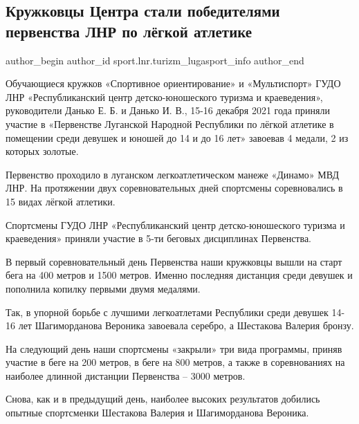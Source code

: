  
 
 
 
 
\subsection{Кружковцы Центра стали победителями первенства ЛНР по лёгкой атлетике}
\label{sec:16_12_2021.stz.sport.lnr.turizm_lugasport_info.1.pervenstvo_lnr_legkaja_atletika}

\ifcmt
 author_begin
   author_id sport.lnr.turizm_lugasport_info
 author_end
\fi

Обучающиеся кружков «Спортивное ориентирование» и «Мультиспорт» ГУДО ЛНР
«Республиканский центр детско-юношеского туризма и краеведения», руководители
Данько Е. Б. и Данько И. В., 15-16 декабря 2021 года приняли участие в
«Первенстве Луганской Народной Республики по лёгкой атлетике в помещении среди
девушек и юношей до 14 и до 16 лет» завоевав 4 медали, 2 из которых золотые.

Первенство проходило в луганском легкоатлетическом манеже «Динамо» МВД ЛНР. На
протяжении двух соревновательных дней спортсмены соревновались  в 15 видах
лёгкой атлетики.

Спортсмены ГУДО ЛНР «Республиканский центр детско-юношеского туризма и
краеведения» приняли участие в 5-ти беговых дисциплинах Первенства.

В первый соревновательный день Первенства наши кружковцы вышли на старт бега на
400 метров и 1500 метров. Именно последняя дистанция среди девушек и пополнила
копилку первыми двумя медалями.

Так, в упорной борьбе с лучшими легкоатлетами Республики среди девушек 14-16
лет Шагиморданова Вероника завоевала серебро, а Шестакова Валерия бронзу.


На следующий день наши спортсмены «закрыли» три вида программы, приняв участие
в беге на 200 метров, в беге на 800 метров, а также в соревнованиях на наиболее
длинной дистанции Первенства – 3000 метров.

Снова, как и в предыдущий день, наиболее высоких результатов добились опытные
спортсменки Шестакова Валерия и Шагиморданова Вероника.

